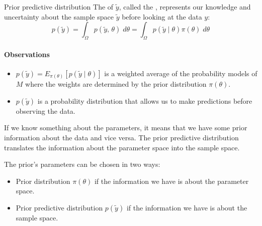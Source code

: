 \begin{definition}{Prior predictive distribution}{}
	The  of $\tilde{y}$, called the ,
	represents our knowledge and uncertainty about the sample space $\tilde{y}$ before looking at the data $y$:
	\begin{equation}
		p(\tilde y) = \int_{\Omega} p(\tilde y ,\, \theta) \;d\theta = \int_{\Omega} p(\tilde y \mid \theta) \pi(\theta) \;d\theta
	\end{equation}

	\paragraph{Observations}
	\begin{itemize}
		\item $p(\tilde y) = E_{\pi(\theta)}[p(\tilde y \mid \theta)]$ is a weighted average of the
		      probability models of $M$ where the weights are determined by the prior distribution $\pi(\theta)$.
		\item $p(\tilde y)$ is a probability distribution that allows us to make predictions before
		      observing the data.
	\end{itemize}
\end{definition}

If we know something about the parameters, it means that we have some prior information about the data
and vice versa. The prior predictive distribution translates the information about the
parameter space into the sample space.

The prior's parameters can be chosen in two ways:
\begin{itemize}
	\item Prior distribution $\pi(\theta)$ if the information we have is about the parameter space.
	\item Prior predictive distribution $p(\tilde y)$ if the information we have is about the sample space.
\end{itemize}

